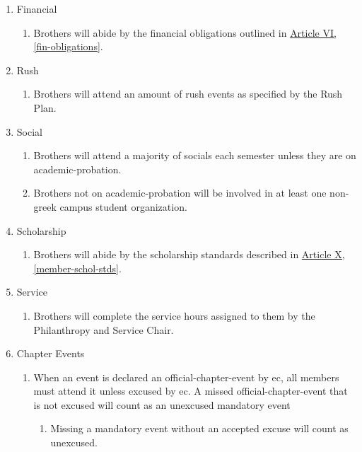 	\begin{enumerate}
		\item Financial
			\begin{enumerate}
				\item Brothers will abide by the financial obligations outlined in \hyperref[fin-obligations]{Article VI, \autoref*{fin-obligations}}.
			\end{enumerate}

		\item Rush
			\begin{enumerate}
				\label{rush-attend-std}
				\item Brothers will \gls{attend} an amount of \gls{rush} events as specified by the Rush Plan.
			\end{enumerate}

		\item Social
			\begin{enumerate}
				\item Brothers will \gls{attend} a majority of \glspl{social} each semester unless they are on \gls{academic-probation}.
				\item Brothers not on \gls{academic-probation} will be involved in at least one non-greek campus student organization.
			\end{enumerate}

		\item Scholarship
			\begin{enumerate}
				\item Brothers will abide by the scholarship standards described in \hyperref[member-schol-stds]{Article X, \autoref*{member-schol-stds}}.
			\end{enumerate}

		\item Service
			\begin{enumerate}
				\item Brothers will complete the service hours assigned to them by the Philanthropy and Service Chair.
			\end{enumerate}

		\item Chapter Events
			\begin{enumerate}
				\item When an event is declared an \gls{official-chapter-event} by \gls{ec}, all members must \gls{attend} it unless excused by \gls{ec}. A missed \gls{official-chapter-event} that is not excused will count as an unexcused mandatory event
					\begin{enumerate}
						\item Missing a mandatory event without an accepted excuse will count as unexcused.


\end{enumerate}
\end{enumerate}
\end{enumerate}
